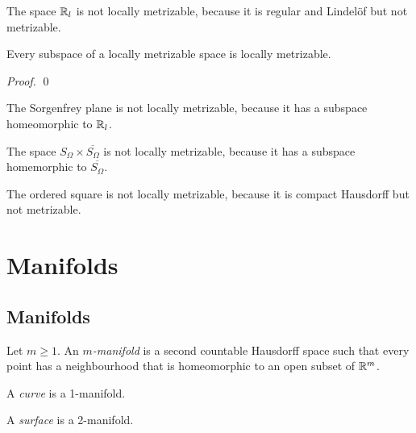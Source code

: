 \begin{example}
    The space $\mathbb{R}_l$ is not locally metrizable, because it is regular and Lindel\"{o}f but not metrizable.
\end{example}

\begin{proposition}
    Every subspace of a locally metrizable space is locally metrizable.
\end{proposition}

\begin{proof}
    \pf
    \qed
\end{proof}

\begin{corollary}
    The Sorgenfrey plane is not locally metrizable, because it has a subspace homeomorphic to $\mathbb{R}_l$.
\end{corollary}

\begin{example}
    The space $S_\Omega \times \overline{S_\Omega}$ is not locally metrizable, because it has a subspace homemorphic to
    $\overline{S_\Omega}$.    
\end{example}

\begin{example}
    The ordered square is not locally metrizable, because it is compact Hausdorff but not metrizable.
\end{example}

\chapter{Manifolds}

\section{Manifolds}

\begin{definition}[Manifold]
    Let $m \geq 1$. An \emph{$m$-manifold} is a second countable Hausdorff space such that every point has a neighbourhood that is
    homeomorphic to an open subset of $\mathbb{R}^m$.

    A \emph{curve} is a 1-manifold.

    A \emph{surface} is a 2-manifold.
\end{definition}

